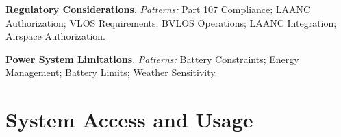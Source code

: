 \noindent\textbf{Regulatory Considerations}. \textit{Patterns:} Part 107 Compliance; LAANC Authorization; VLOS Requirements; BVLOS Operations; LAANC Integration; Airspace Authorization.\par\smallskip

\noindent\textbf{Power System Limitations}. \textit{Patterns:} Battery Constraints; Energy Management; Battery Limits; Weather Sensitivity.\par\smallskip

\section{System Access and Usage}
\label{appendix:system_access}

